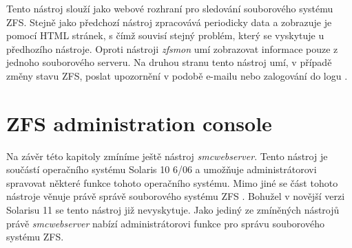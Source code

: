 Tento nástroj slouží jako webové rozhraní pro sledování souborového systému ZFS. Stejně jako předchozí nástroj zpracovává periodicky data a zobrazuje je pomocí HTML stránek, s čímž souvisí stejný problém, který se vyskytuje u předhozího nástroje. Oproti nástroji \emph{zfsmon} umí zobrazovat informace pouze z jednoho souborového serveru. Na druhou stranu tento nástroj umí, v případě změny stavu ZFS, poslat upozornění v podobě e-mailu nebo zalogování do logu \cite{zfswatcher}.
\section{ZFS administration console}
Na závěr této kapitoly zmíníme ještě nástroj \emph{smcwebserver}. Tento nástroj je součástí operačního systému Solaris 10 6/06 a umožňuje administrátorovi spravovat některé funkce tohoto operačního systému. Mimo jiné se část tohoto nástroje věnuje právě správě souborového systému ZFS \cite{smc}. Bohužel v novější verzi Solarisu 11 se tento nástroj již nevyskytuje. Jako jediný ze zmíněných nástrojů právě \emph{smcwebserver} nabízí administrátorovi funkce pro správu souborového systému ZFS.